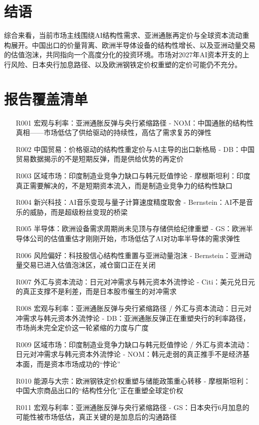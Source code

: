 \documentclass[11pt]{ctexart}
\begin{document}
\section{结语}
综合来看，当前市场主线围绕AI结构性需求、亚洲通胀再定价与全球资本流动重构展开。中国出口的价量背离、欧洲半导体设备的结构性增长、以及亚洲动量交易的估值泡沫，共同指向一个高度分化的投资环境。市场对2027年AI资本开支的上行风险、日本央行加息路径、以及欧洲钢铁定价权重塑的定价可能仍不充分。
\newpage
\section{报告覆盖清单}
\begin{itemize}
  \item [R001] 宏观与利率：亚洲通胀反弹与央行紧缩路径 - NOM：中国通胀的结构性真相——市场低估了供给驱动的持续性，高估了需求复苏的弹性
  \item [R002] 中国贸易：价格驱动的结构性重定价与AI主导的出口新格局 - DB：中国贸易数据揭示的不是短期反弹，而是供给优势的再定价
  \item [R003] 区域市场：印度制造业竞争力缺口与韩元贬值悖论 - 摩根斯坦利：印度真正需要解决的，不是短期资本流入，而是制造业竞争力的结构性缺口
  \item [R004] 新兴科技：AI音乐变现与量子计算速度精度取舍 - Bernstein：AI不是音乐的威胁，而是超级粉丝变现的桥梁
  \item [R005] 半导体：欧洲设备需求周期尚未见顶与存储供给纪律重塑 - GS：欧洲半导体公司的估值重估才刚刚开始，市场低估了AI对功率半导体的需求弹性
  \item [R006] 风险偏好：科技股信心结构性重置与亚洲动量泡沫 - Bernstein：亚洲动量交易已进入估值泡沫区，减仓窗口正在关闭
  \item [R007] 外汇与资本流动：日元对冲需求与韩元资本外流悖论 - Citi：美元兑日元的真正支撑不是利差，而是日本股市催生的对冲需求
  \item [R008] 宏观与利率：亚洲通胀反弹与央行紧缩路径 / 外汇与资本流动：日元对冲需求与韩元资本外流悖论 - DB：亚洲通胀反弹正在重塑央行的利率路径，市场尚未完全定价这一轮紧缩的力度与广度
  \item [R009] 区域市场：印度制造业竞争力缺口与韩元贬值悖论 / 外汇与资本流动：日元对冲需求与韩元资本外流悖论 - NOM：韩元走弱的真正推手不是经济基本面，而是资本市场成功的“悖论”
  \item [R010] 能源与大宗：欧洲钢铁定价权重塑与储能政策重心转移 - 摩根斯坦利：中国大宗商品出口的“结构性分化”正在重塑全球定价权
  \item [R011] 宏观与利率：亚洲通胀反弹与央行紧缩路径 - GS：日本央行6月加息的可能性被市场低估，真正关键的是加息后的沟通路径

\end{itemize}
\end{document}
